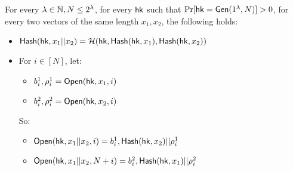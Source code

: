 \begin{definition} [Properties of $\MT$]
\begin{itemize}
    For every $\lambda\in\mathbb{N}, N\leq 2^\lambda$, for every $\mathsf{hk}$ such that $\Pr[\mathsf{hk} = \mathsf{Gen}(1^\lambda, N)] > 0$, for every two vectors of the same length $x_1, x_2$, the following holds:
    \begin{itemize}
        \item $\mathsf{Hash}(\mathsf{hk}, x_1 || x_2) = \mathcal{H}(\mathsf{hk}, \mathsf{Hash}(\mathsf{hk}, x_1), \mathsf{Hash}(\mathsf{hk}, x_2))$
        \item For $i\in[N]$, let:
        \begin{itemize}
            \item $b^1_i, \rho^1_i=\mathsf{Open}(\mathsf{hk}, x_1, i)$
            \item $b^2_i, \rho^2_i=\mathsf{Open}(\mathsf{hk}, x_2, i)$
        \end{itemize}
        So: 
        \begin{itemize}
            \item $\mathsf{Open}(\mathsf{hk}, x_1||x_2, i) = b^1_i, \mathsf{Hash}(\mathsf{hk}, x_2) || \rho^1_i$
            \item $\mathsf{Open}(\mathsf{hk}, x_1||x_2, N+i) = b^2_i, \mathsf{Hash}(\mathsf{hk}, x_1) || \rho^2_i$
        \end{itemize}
    \end{itemize}
    
\end{itemize}
\end{definition}

